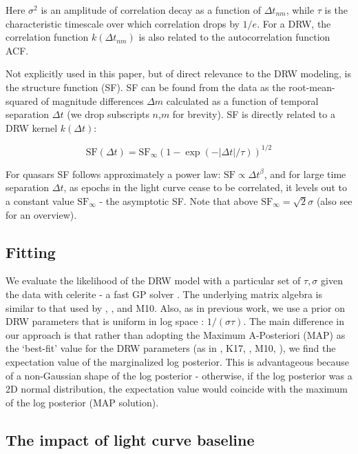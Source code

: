 \documentclass[twocolumn]{aastex62}
\newcommand{\project}[1]{\textsf{#1}}
\begin{document}
Here $\sigma^{2}$ is an amplitude of correlation decay as a function of $\Delta t_{nm}$,  while $\tau$ is the characteristic timescale over which correlation drops by $1/e$. For a DRW,  the correlation function $k(\Delta t_{nm})$ is also related to the autocorrelation function ACF. 

Not explicitly used in this paper, but of direct relevance to the DRW modeling, is the structure function (SF). SF can be found from the data as the root-mean-squared of  magnitude differences $\Delta m$  calculated as a function of temporal separation $\Delta t$ (we drop subscripts $n$,$m$ for brevity). SF is directly related to a DRW kernel $k(\Delta t)$:

\begin{equation}
\mathrm{SF}(\Delta t) = \mathrm{SF}_{\infty} (1-\exp{(-|\Delta t|/\tau)})^{1/2}
\end{equation}

For quasars SF follows approximately a power law: $\mathrm{SF} \propto \Delta t^{\beta}$,  and for large time separation $\Delta t$, as epochs in the light curve cease to be correlated, it levels out to a constant value $\mathrm{SF}_{\infty}$ - the asymptotic SF.  Note that above $\mathrm{SF}_\infty = \sqrt{2} \sigma$ (also see \citet{macleod2012, bauer2009, graham2015a} for an overview).


\subsection{Fitting}
We evaluate the likelihood of the DRW model with a particular set of $\tau,\sigma$ given the data with \project{celerite}  - a fast GP solver \citep{foreman2017}. The underlying matrix algebra is similar to that used by \cite{rybicki1992}, \cite{kozlowski2010}, and M10. Also, as in previous work, we use a prior on DRW parameters that is  uniform  in log space :  $1 / (\sigma \tau)$. The main difference in our approach is that rather than adopting the Maximum A-Posteriori (MAP) as the `best-fit' value for the DRW parameters (as in \citealt{kozlowski2010}, K17, \citealt{kozlowski2016b}, M10, \citealt{macleod2011}),  we find the expectation value of the marginalized log posterior. This is advantageous because of a non-Gaussian shape of the log posterior - otherwise, if the log posterior was a 2D normal distribution, the expectation value would coincide with the maximum of the log posterior (MAP solution). 

\subsection{The impact of light curve baseline}\label{sec:baseline}
\end{document}
